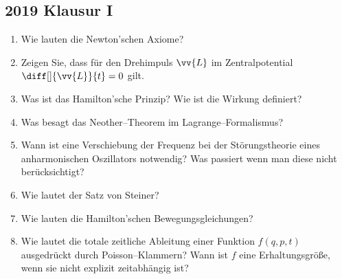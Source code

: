 \documentclass[a4paper,12pt]{article}
\numberwithin{equation}{section}
\begin{document}
\subsection{2019 Klausur I}
\begin{enumerate}[label=\arabic*.]
        \item Wie lauten die Newton'schen Axiome?
        \item Zeigen Sie, dass für den Drehimpuls $\vv{L}$ im Zentralpotential $\diff[]{\vv{L}}{t}=0$ gilt.
        \item Was ist das Hamilton'sche Prinzip? Wie ist die Wirkung definiert?
        \item Was besagt das Neother--Theorem im Lagrange--Formalismus?
        \item Wann ist eine Verschiebung der Frequenz bei der Störungstheorie eines anharmonischen Oszillators notwendig? Was passiert wenn man diese nicht berücksichtigt?
        \item Wie lautet der Satz von Steiner?
        \item Wie lauten die Hamilton'schen Bewegungsgleichungen?
        \item Wie lautet die totale zeitliche Ableitung einer Funktion $f\left(q,p,t\right)$ ausgedrückt durch Poisson--Klammern? Wann ist $f$ eine Erhaltungsgröße, wenn sie nicht explizit zeitabhängig ist?
\end{enumerate}

\end{document}
